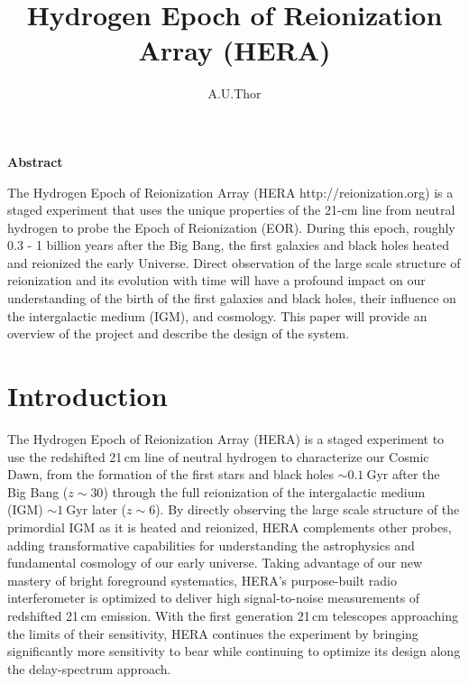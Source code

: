 \documentclass[preprint,11pt]{aastex}
\title{Hydrogen Epoch of Reionization Array (HERA)}
\author{A.U.Thor}
\begin{document}
\maketitle

\begin{center}
\textbf{Abstract}
\end{center}

The Hydrogen Epoch of Reionization Array (HERA http://reionization.org) is a staged experiment that uses the unique properties of the 21-cm line from neutral hydrogen to probe the Epoch of Reionization (EOR). During this epoch, roughly 0.3 - 1 billion years after the Big Bang, the first galaxies and black holes heated and reionized the early Universe. Direct observation of the large scale structure of reionization and its evolution with time will have a profound impact on our understanding of the birth of the first galaxies and black holes, their influence on the intergalactic medium (IGM), and cosmology.  This paper will provide an overview of the project and describe the design of the system.

\section{Introduction}

\noindent The Hydrogen Epoch of Reionization Array (HERA) is a staged experiment to use the redshifted 21\,cm line
of neutral hydrogen to characterize our Cosmic Dawn, from
the formation of the first stars and black holes $\sim0.1~$Gyr after the Big
Bang ($z\sim30$) through the full reionization of the intergalactic medium
(IGM) $\sim1~$Gyr later ($z\sim6$).  By directly observing the large scale
structure of the primordial IGM as it is heated and reionized, HERA complements
other probes, adding transformative capabilities for
understanding the astrophysics and fundamental cosmology of our early universe.
Taking advantage of our new mastery of bright foreground systematics, HERA's
purpose-built radio
interferometer is optimized to deliver high signal-to-noise measurements of
redshifted 21\,cm emission.
With the first generation 21\,cm telescopes approaching the limits of their sensitivity, HERA continues the experiment by bringing significantly more sensitivity to bear
while continuing to optimize its design along the delay-spectrum approach.
\end{document}
